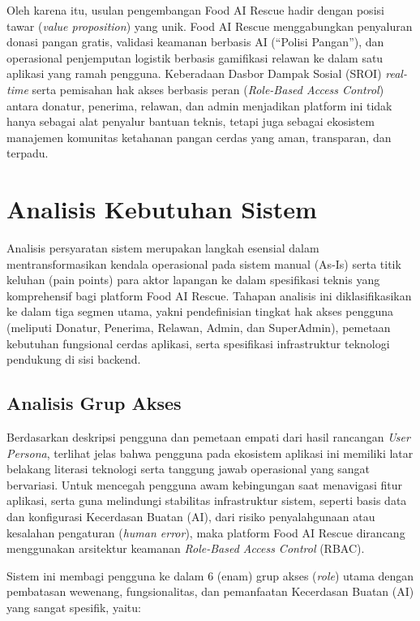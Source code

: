 \par Oleh karena itu, usulan pengembangan Food AI Rescue hadir dengan posisi tawar (\textit{value proposition}) yang unik. Food AI Rescue menggabungkan penyaluran donasi pangan gratis, validasi keamanan berbasis AI (``Polisi Pangan''), dan operasional penjemputan logistik berbasis gamifikasi relawan ke dalam satu aplikasi yang ramah pengguna. Keberadaan Dasbor Dampak Sosial (SROI) \textit{real-time} serta pemisahan hak akses berbasis peran (\textit{Role-Based Access Control}) antara donatur, penerima, relawan, dan admin menjadikan platform ini tidak hanya sebagai alat penyalur bantuan teknis, tetapi juga sebagai ekosistem manajemen komunitas ketahanan pangan cerdas yang aman, transparan, dan terpadu.

\section{Analisis Kebutuhan Sistem}
Analisis persyaratan sistem merupakan langkah esensial dalam mentransformasikan kendala operasional pada sistem manual (As-Is) serta titik keluhan (pain points) para aktor lapangan ke dalam spesifikasi teknis yang komprehensif bagi platform Food AI Rescue. Tahapan analisis ini diklasifikasikan ke dalam tiga segmen utama, yakni pendefinisian tingkat hak akses pengguna (meliputi Donatur, Penerima, Relawan, Admin, dan SuperAdmin), pemetaan kebutuhan fungsional cerdas aplikasi, serta spesifikasi infrastruktur teknologi pendukung di sisi backend.

\subsection{Analisis Grup Akses}
\par Berdasarkan deskripsi pengguna dan pemetaan empati dari hasil rancangan \textit{User Persona}, terlihat jelas bahwa pengguna pada ekosistem aplikasi ini memiliki latar belakang literasi teknologi serta tanggung jawab operasional yang sangat bervariasi. Untuk mencegah pengguna awam kebingungan saat menavigasi fitur aplikasi, serta guna melindungi stabilitas infrastruktur sistem, seperti basis data dan konfigurasi Kecerdasan Buatan (AI), dari risiko penyalahgunaan atau kesalahan pengaturan (\textit{human error}), maka platform Food AI Rescue dirancang menggunakan arsitektur keamanan \textit{Role-Based Access Control} (RBAC).

\par Sistem ini membagi pengguna ke dalam 6 (enam) grup akses (\textit{role}) utama dengan pembatasan wewenang, fungsionalitas, dan pemanfaatan Kecerdasan Buatan (AI) yang sangat spesifik, yaitu:

